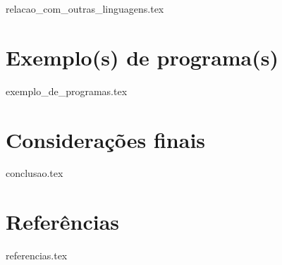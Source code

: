 \documentclass[aspectratio=169]{beamer}
\begin{document}
    {relacao_com_outras_linguagens.tex}


    \section{Exemplo(s) de programa(s)}

    {exemplo_de_programas.tex}

    \section{Considerações finais}

    {conclusao.tex}
    
    \section{Referências}

    {referencias.tex}

\end{document}
